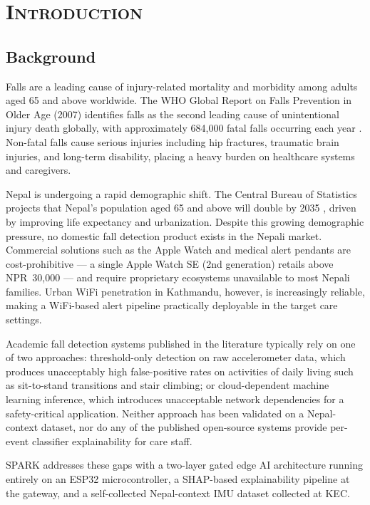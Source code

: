 
\chapter{\scshape Introduction}

\section{Background}

Falls are a leading cause of injury-related mortality and morbidity among adults aged 65 and above worldwide. The WHO Global Report on Falls Prevention in Older Age (2007) identifies falls as the second leading cause of unintentional injury death globally, with approximately 684,000 fatal falls occurring each year \cite{who2007falls}. Non-fatal falls cause serious injuries including hip fractures, traumatic brain injuries, and long-term disability, placing a heavy burden on healthcare systems and caregivers.

Nepal is undergoing a rapid demographic shift. The Central Bureau of Statistics projects that Nepal's population aged 65 and above will double by 2035 \cite{cbs2021nepal}, driven by improving life expectancy and urbanization. Despite this growing demographic pressure, no domestic fall detection product exists in the Nepali market. Commercial solutions such as the Apple Watch and medical alert pendants are cost-prohibitive --- a single Apple Watch SE (2nd generation) retails above NPR~30,000 --- and require proprietary ecosystems unavailable to most Nepali families. Urban WiFi penetration in Kathmandu, however, is increasingly reliable, making a WiFi-based alert pipeline practically deployable in the target care settings.

Academic fall detection systems published in the literature typically rely on one of two approaches: threshold-only detection on raw accelerometer data, which produces unacceptably high false-positive rates on activities of daily living such as sit-to-stand transitions and stair climbing; or cloud-dependent machine learning inference, which introduces unacceptable network dependencies for a safety-critical application. Neither approach has been validated on a Nepal-context dataset, nor do any of the published open-source systems provide per-event classifier explainability for care staff.

SPARK addresses these gaps with a two-layer gated edge AI architecture running entirely on an ESP32 microcontroller, a SHAP-based explainability pipeline at the gateway, and a self-collected Nepal-context IMU dataset collected at KEC.

